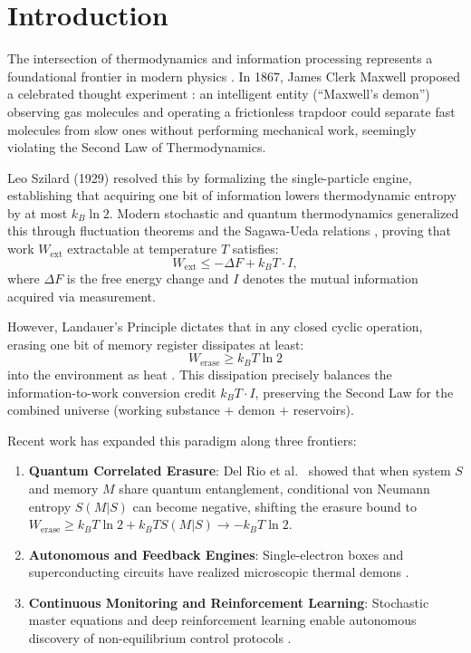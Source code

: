 \documentclass[10pt,twocolumn,a4paper]{article}
\begin{document}
\section{Introduction}
The intersection of thermodynamics and information processing represents a foundational frontier in modern physics \cite{parrondo2015thermodynamics, pekola2015towards}. In 1867, James Clerk Maxwell proposed a celebrated thought experiment \cite{maxwell1871theory}: an intelligent entity (``Maxwell's demon'') observing gas molecules and operating a frictionless trapdoor could separate fast molecules from slow ones without performing mechanical work, seemingly violating the Second Law of Thermodynamics.

Leo Szilard (1929) \cite{szilard1929entropieverminderung} resolved this by formalizing the single-particle engine, establishing that acquiring one bit of information lowers thermodynamic entropy by at most $k_B\ln 2$. Modern stochastic and quantum thermodynamics generalized this through fluctuation theorems and the Sagawa-Ueda relations \cite{sagawa2008second, sagawa2010generalized, jarzynski1997nonequilibrium}, proving that work $W_{\mathrm{ext}}$ extractable at temperature $T$ satisfies:
\begin{equation}
W_{\mathrm{ext}} \le -\Delta F + k_B T \cdot I,
\label{eq:sagawa_ueda}
\end{equation}
where $\Delta F$ is the free energy change and $I$ denotes the mutual information acquired via measurement.

However, Landauer's Principle \cite{landauer1961irreversibility} dictates that in any closed cyclic operation, erasing one bit of memory register dissipates at least:
\begin{equation}
W_{\mathrm{erase}} \ge k_B T \ln 2
\label{eq:landauer_bound}
\end{equation}
into the environment as heat \cite{bennett1982thermodynamics}. This dissipation precisely balances the information-to-work conversion credit $k_BT\cdot I$, preserving the Second Law for the combined universe (working substance $+$ demon $+$ reservoirs).

Recent work has expanded this paradigm along three frontiers:
\begin{enumerate}
    \item \textbf{Quantum Correlated Erasure}: Del Rio et al.~\cite{delrio2011thermodynamic} showed that when system $S$ and memory $M$ share quantum entanglement, conditional von Neumann entropy $S(M|S)$ can become negative, shifting the erasure bound to $W_{\mathrm{erase}} \ge k_B T \ln 2 + k_B T S(M|S) \to -k_B T \ln 2$.
    \item \textbf{Autonomous and Feedback Engines}: Single-electron boxes and superconducting circuits have realized microscopic thermal demons \cite{koski2014experimental, koski2015onchip, berut2012experimental, jun2014high, hong2016experimental}.
    \item \textbf{Continuous Monitoring and Reinforcement Learning}: Stochastic master equations and deep reinforcement learning enable autonomous discovery of non-equilibrium control protocols \cite{rouchon2015efficient, duncan1970calculation, schulman2017proximal}.
\end{enumerate}
\end{document}
